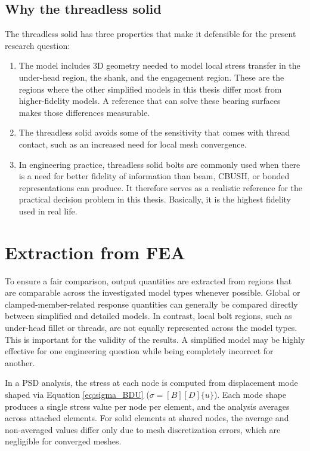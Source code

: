 \documentclass[a4paper,twoside]{bth}
\begin{document}
\subsection{Why the threadless solid}
The threadless solid has three properties that make it defensible for the present research question:
\begin{enumerate}
    \item The model includes 3D geometry needed to model local stress transfer in the under-head region, the shank, and the engagement region. These are the regions where the other simplified models in this thesis differ most from higher-fidelity models. A reference that can solve these bearing surfaces makes those differences measurable.
    \item The threadless solid avoids some of the sensitivity that comes with thread contact, such as an increased need for local mesh convergence.
    \item In engineering practice, threadless solid bolts are commonly used when there is a need for better fidelity of information than beam, CBUSH, or bonded representations can produce. It therefore serves as a realistic reference for the practical decision problem in this thesis. Basically, it is the highest fidelity used in real life.
\end{enumerate}


\newpage
\section{Extraction from FEA}

To ensure a fair comparison, output quantities are extracted from regions that are comparable across the investigated model types whenever possible. Global or clamped-member-related response quantities can generally be compared directly between simplified and detailed models. In contrast, local bolt regions, such as under-head fillet or threads, are not equally represented across the model types. This is important for the validity of the results. A simplified model may be highly effective for one engineering question while being completely incorrect for another.

In a \ac{PSD} analysis, the stress at each node is computed from displacement mode shaped via Equation \ref{eq:sigma_BDU} ($\sigma = [B][D]\{u\}$). Each mode shape produces a single stress value per node per element, and the analysis averages across attached elements. For solid elements at shared nodes, the average and non-averaged values differ only due to mesh discretization errors, which are negligible for converged meshes.
\end{document}

